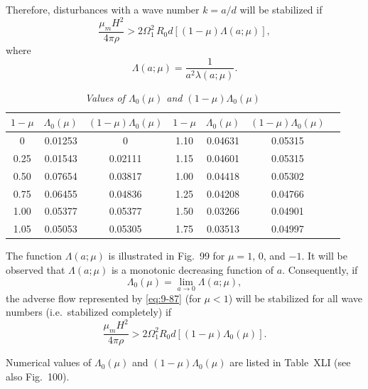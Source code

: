 Therefore, disturbances with a wave number $k = a/d$ will be stabilized if
\begin{equation}
\frac{\mu_m H^2}{4\pi\rho} > 2\Omega_1^2\, R_0 d[(1-\mu)\Lambda(a;\mu)], \label{eq:9-96}
\end{equation}
where
\begin{equation}
\Lambda(a;\mu) = \frac{1}{a^2 \lambda(a;\mu)}. \label{eq:9-97}
\end{equation}


\begin{table}[ht]
\centering
\caption*{TABLE XLI}
\caption*{\textit{Values of $\Lambda_0(\mu)$ and $(1-\mu)\Lambda_0(\mu)$}}
\begin{tabular}{ccccccc}
\hline
$1-\mu$ & $\Lambda_0(\mu)$ & $(1-\mu)\Lambda_0(\mu)$ & $1-\mu$ & $\Lambda_0(\mu)$ & $(1-\mu)\Lambda_0(\mu)$ \\
\hline
0 & 0.01253 & 0 & 1.10 & 0.04631 & 0.05315 \\
0.25 & 0.01543 & 0.02111 & 1.15 & 0.04601 & 0.05315 \\
0.50 & 0.07654 & 0.03817 & 1.00 & 0.04418 & 0.05302 \\
0.75 & 0.06455 & 0.04836 & 1.25 & 0.04208 & 0.04766 \\
1.00 & 0.05377 & 0.05377 & 1.50 & 0.03266 & 0.04901 \\
1.05 & 0.05053 & 0.05305 & 1.75 & 0.03513 & 0.04997 \\
\hline
\end{tabular}
\end{table}

The function $\Lambda(a;\mu)$ is illustrated in Fig.~99 for $\mu = 1$, 0, and $-1$. It will be observed that $\Lambda(a;\mu)$ is a monotonic decreasing function of $a$. Consequently, if
\begin{equation}
\Lambda_0(\mu) = \lim_{a \to 0} \Lambda(a;\mu), \label{eq:9-98}
\end{equation}
the adverse flow represented by \eqref{eq:9-87} (for $\mu < 1$) will be stabilized for all wave numbers (i.e.\ stabilized completely) if
\begin{equation}
\frac{\mu_m H^2}{4\pi\rho} > 2\Omega_1^2 R_0 d[(1-\mu)\Lambda_0(\mu)]. \label{eq:9-99}
\end{equation}

Numerical values of $\Lambda_0(\mu)$ and $(1-\mu)\Lambda_0(\mu)$ are listed in Table~XLI (see also Fig.~100).

